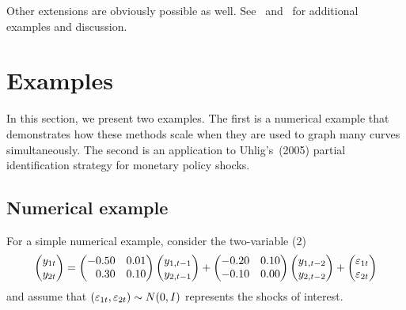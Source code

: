 \documentclass[12pt,fleqn]{article}
\begin{document}
Other extensions are obviously possible as well. See~\citet{FRSW:07}
and~\citet{HaS:13} for additional examples and discussion.

\section{Examples}
\label{S3}
In this section, we present two examples. The first is a numerical
example that demonstrates how these methods scale when they are used
to graph many curves simultaneously. The second is an application to
Uhlig's~(2005) partial identification strategy for monetary policy
shocks.
\nocite{Uhl:05}

\subsection{Numerical example}
\label{S3.1}

For a simple numerical example, consider the two-variable \VAR(2)
\begin{equation}
  \label{eq:12}
  \begin{pmatrix*}[l]
    y_{1t} \\ y_{2t}
  \end{pmatrix*}
  =
  \begin{pmatrix*}[r]
    - 0.50 & 0.01 \\ 0.30 & 0.10
  \end{pmatrix*}
  \begin{pmatrix*}[l]
    y_{1,t-1} \\ y_{2,t-1}
  \end{pmatrix*}
  +
  \begin{pmatrix*}[r]
    -0.20 & 0.10 \\ -0.10 & 0.00
  \end{pmatrix*}
  \begin{pmatrix*}[l]
    y_{1,t-2} \\ y_{2,t-2}
  \end{pmatrix*}
  +
  \begin{pmatrix*}[l]
    \vep_{1t} \\ \vep_{2t}
  \end{pmatrix*}
\end{equation}
and assume that $(\varepsilon_{1t},\varepsilon_{2t}) \sim N(0,I)$ represents the
shocks of interest.
\end{document}
